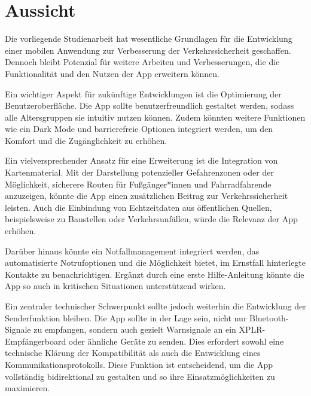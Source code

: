 \documentclass[a4paper, 12pt]{article} %
\begin{document}
\clearpage

\section{Aussicht}




\begin{spacing}{1.8}  %
\fontsize{14pt}{15pt}\selectfont  %

Die vorliegende Studienarbeit hat wesentliche Grundlagen für die Entwicklung einer mobilen 
Anwendung zur Verbesserung der Verkehrssicherheit geschaffen. Dennoch bleibt Potenzial für weitere Arbeiten und Verbesserungen, die die
 Funktionalität und den Nutzen der App erweitern können.

Ein wichtiger Aspekt für zukünftige Entwicklungen ist die Optimierung der Benutzeroberfläche. 
Die App sollte benutzerfreundlich gestaltet werden, sodass alle Altersgruppen sie intuitiv nutzen können. 
Zudem könnten weitere Funktionen wie ein Dark Mode und barrierefreie Optionen integriert werden, um den Komfort und die Zugänglichkeit zu erhöhen.

Ein vielversprechender Ansatz für eine Erweiterung ist die Integration von Kartenmaterial. Mit der Darstellung
 potenzieller Gefahrenzonen oder der Möglichkeit, sicherere Routen für Fußgänger*innen und Fahrradfahrende anzuzeigen,
  könnte die App einen zusätzlichen Beitrag zur Verkehrssicherheit leisten. Auch die Einbindung von Echtzeitdaten aus öffentlichen 
  Quellen, beispielsweise zu Baustellen oder Verkehrsunfällen, würde die Relevanz der App erhöhen.

Darüber hinaus könnte ein Notfallmanagement integriert werden, das automatisierte Notrufoptionen und die Möglichkeit 
bietet, im Ernstfall hinterlegte Kontakte zu benachrichtigen. Ergänzt durch eine erste Hilfe-Anleitung könnte die App so auch in 
kritischen Situationen unterstützend wirken.

Ein zentraler technischer Schwerpunkt sollte jedoch weiterhin die Entwicklung der Senderfunktion bleiben. Die App
 sollte in der Lage sein, nicht nur Bluetooth-Signale zu empfangen, sondern auch gezielt Warnsignale an ein XPLR-Empfängerboard
  oder ähnliche Geräte zu senden. Dies erfordert sowohl eine technische Klärung der Kompatibilität als auch die Entwicklung eines
   Kommunikationsprotokolls. Diese Funktion ist entscheidend, um die App vollständig bidirektional zu gestalten und so ihre Einsatzmöglichkeiten zu maximieren.


\end{spacing}
\end{document}
